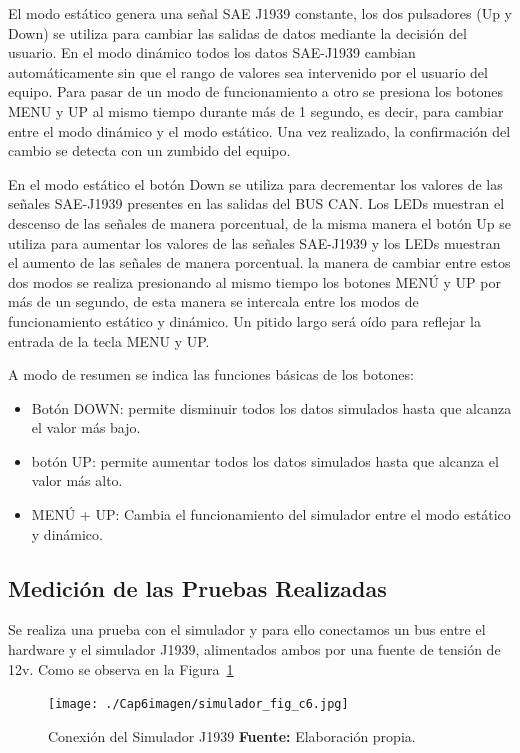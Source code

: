 El modo estático genera una señal SAE J1939 constante, los  dos pulsadores (Up y Down) se utiliza para cambiar las salidas de datos mediante la decisión del usuario. 
En el modo dinámico todos los datos SAE-J1939 cambian automáticamente sin que el rango de valores sea intervenido por el usuario del equipo. 
Para pasar de un modo de funcionamiento a otro se presiona los botones MENU y UP al mismo tiempo durante más de 1 segundo, es decir, para cambiar entre el modo dinámico y el modo estático. 
Una vez realizado, la confirmación del cambio se detecta con un zumbido del equipo.

En el modo estático el botón Down se utiliza para decrementar los valores de las señales SAE-J1939 presentes en las salidas del BUS CAN. 
Los LEDs muestran el descenso de las señales de manera porcentual, de la misma manera el botón Up se utiliza para aumentar los valores de las señales SAE-J1939 y los LEDs muestran el aumento de las señales de manera porcentual. 
la manera de cambiar entre estos dos modos se realiza presionando al mismo tiempo los botones MENÚ y UP por más de un segundo, de esta manera se intercala entre los modos de funcionamiento estático y dinámico. 
Un pitido largo será oído para reflejar la entrada de la tecla MENU y UP.

A modo de resumen se indica las funciones básicas de los botones:
\begin{itemize}
\item Botón DOWN: permite disminuir todos los datos simulados hasta que alcanza el valor más bajo.
 \item botón UP: permite aumentar todos los datos simulados hasta que alcanza el valor más alto.
\item MENÚ + UP: Cambia el funcionamiento del simulador entre el modo estático y dinámico.

\end{itemize}

\subsection{Medición de las Pruebas Realizadas}
Se realiza una prueba con el simulador y para ello conectamos un bus entre el hardware y el simulador J1939, alimentados ambos por una fuente de tensión de 12v. Como se observa en la Figura~\ref{simulador_ref_c6}

\begin{figure}[H]
	\centering
	\texttt{[image: ./Cap6imagen/simulador\_fig\_c6.jpg]}
	\caption [Conexión del Simulador J1939.]{Conexión del Simulador J1939 \textbf{ Fuente:} %
		Elaboración propia.}
	\label{simulador_ref_c6} %
\end{figure}

